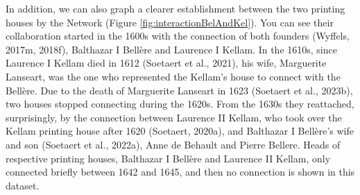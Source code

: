\documentclass[12pt,a4paper,oneside]{book}
\begin{document}
\begin{sloppypar}
\begin{table}[H]
\centering
\caption{Modularity Class of the Two Printing Houses}
\label{tab:modularityClass}
\end{table}

In addition, we can also graph a clearer establishment between the two printing houses by the Network (Figure \ref{fig:interactionBelAndKel}). You can see their collaboration started in the 1600s with the connection of both founders (Wyffels, 2017m, 2018f), Balthazar I Bellère and Laurence I Kellam. In the 1610s, since Laurence I Kellam died in 1612 (Soetaert et al., 2021), his wife, Marguerite Lanseart, was the one who represented the Kellam’s house to connect with the Bellère. Due to the death of Marguerite Lanseart in 1623 (Soetaert et al., 2023b), two houses stopped connecting during the 1620s. From the 1630s they reattached, surprisingly, by the connection between Laurence II Kellam, who took over the Kellam printing house after 1620 (Soetaert, 2020a), and Balthazar I Bellère’s wife and son (Soetaert et al., 2022a), Anne de Behault and Pierre Bellere. Heads of respective printing houses, Balthazar I Bellère and Laurence II Kellam, only connected briefly between 1642 and 1645, and then no connection is shown in this dataset.


\end{sloppypar}
\end{document}
